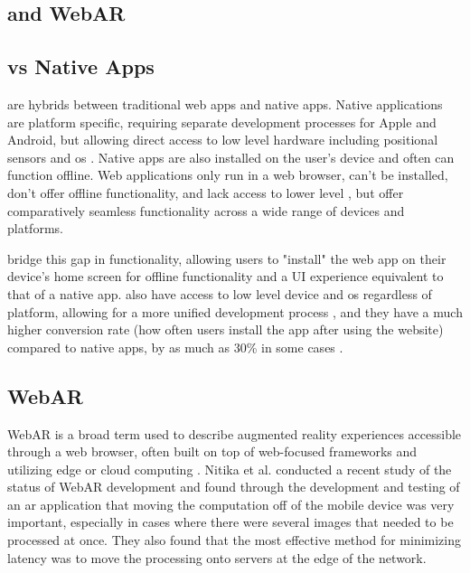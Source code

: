 \documentclass[thesis]{fputhesis}
\begin{document}
\begin{body}
\section{ and WebAR}  
\subsection{ vs Native Apps}
 are hybrids between traditional web apps and native apps. Native applications are platform specific, requiring separate development processes for Apple and Android, but allowing direct access to low level hardware  including positional sensors and \acrfull{os} . Native apps are also installed on the user's device and often can function offline. Web applications only run in a web browser, can't be installed, don't offer offline functionality, and lack access to lower level , but offer comparatively seamless functionality across a wide range of devices and platforms.  

 bridge this gap in functionality, allowing users to "install" the web app on their device's home screen for offline functionality and a UI experience equivalent to that of a native app.   also have access to low level device and \acrshort{os}  regardless of platform, allowing for a more unified development process \cite{fortunato_progressive_2018}, and they have a much higher conversion rate (how often users install the app after using the website) compared to native apps, by as much as 30\% in some cases \cite{majchrzak_progressive_nodate}.

\subsection{WebAR}
WebAR is a broad term used to describe augmented reality experiences accessible through a web browser, often built on top of web-focused frameworks and utilizing edge or cloud computing \cite{qiao_web_2019}. Nitika et al. \cite{nitika_study_2021} conducted a recent study of the status of WebAR development and found through the development and testing of an \acrshort{ar} application that moving the computation off of the mobile device was very important, especially in cases where there were several images that needed to be processed at once. They also found that the most effective method for minimizing latency was to move the processing onto servers at the edge of the network.


\end{body}
\end{document}
